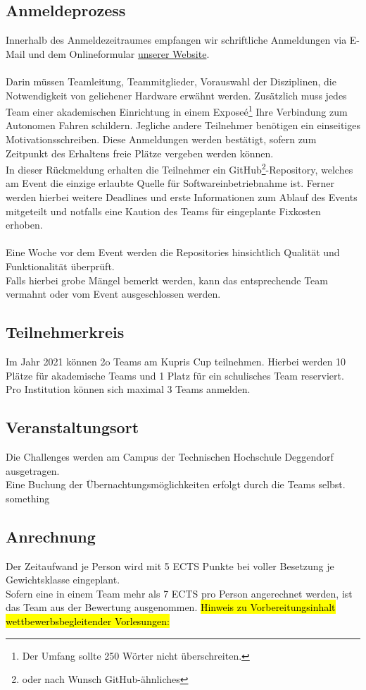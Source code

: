 \documentclass[11pt]{article}
\begin{document}
\subsection{Anmeldeprozess}
Innerhalb des Anmeldezeitraumes empfangen wir schriftliche Anmeldungen via E-Mail und dem Onlineformular \href{https://hg-deggendorf.gi.de}{unserer Website}.\\
\\
Darin müssen Teamleitung, Teammitglieder, Vorauswahl der Disziplinen, die Notwendigkeit von geliehener Hardware erwähnt werden. Zusätzlich muss jedes Team einer akademischen Einrichtung in einem Exposeé\footnote{Der Umfang sollte 250 Wörter nicht überschreiten.} Ihre Verbindung zum Autonomen Fahren schildern. Jegliche andere Teilnehmer benötigen ein einseitiges Motivationsschreiben. Diese Anmeldungen werden bestätigt, sofern zum Zeitpunkt des Erhaltens freie Plätze vergeben werden können.\\
In dieser Rückmeldung erhalten die Teilnehmer ein GitHub\footnote{oder nach Wunsch GitHub-ähnliches}-Repository, welches am Event die einzige erlaubte Quelle für Softwareinbetriebnahme ist. Ferner werden hierbei weitere Deadlines und erste Informationen zum Ablauf des Events mitgeteilt und notfalls eine Kaution des Teams für eingeplante Fixkosten erhoben.\\
\\
Eine Woche vor dem Event werden die Repositories hinsichtlich Qualität und Funktionalität überprüft.\\
Falls hierbei grobe Mängel bemerkt werden, kann das entsprechende Team vermahnt oder vom Event ausgeschlossen werden.
\subsection{Teilnehmerkreis}
Im Jahr 2021 können 2o Teams am Kupris Cup teilnehmen.
Hierbei werden 10 Plätze für akademische Teams und 1 Platz für ein schulisches Team reserviert.
Pro Institution können sich maximal 3 Teams anmelden.
\subsection{Veranstaltungsort}
Die Challenges werden am Campus der Technischen Hochschule Deggendorf ausgetragen.\\
Eine Buchung der Übernachtungsmöglichkeiten erfolgt durch die Teams selbst.
something
\subsection{Anrechnung}
Der Zeitaufwand je Person wird mit 5 ECTS Punkte bei voller Besetzung je Gewichtsklasse eingeplant.\\
Sofern eine in einem Team mehr als 7 ECTS pro Person angerechnet werden, ist das Team aus der Bewertung ausgenommen.
\hl{Hinweis zu Vorbereitungsinhalt wettbewerbsbegleitender Vorlesungen:}
\end{document}
